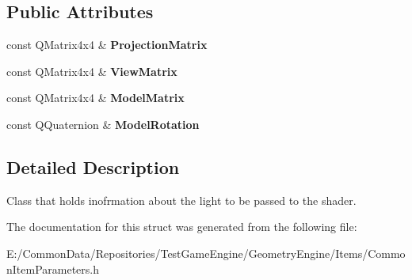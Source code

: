 \subsection*{Public Attributes}
\begin{DoxyCompactItemize}
\item 
\mbox{\label{struct_geometry_engine_1_1_lighting_transformation_data_a67f3cbd5104398dae3988fe228128422}} 
const Q\+Matrix4x4 \& {\bfseries Projection\+Matrix}
\item 
\mbox{\label{struct_geometry_engine_1_1_lighting_transformation_data_ae7610e04dd2bc7c8fc05c69d6809dda6}} 
const Q\+Matrix4x4 \& {\bfseries View\+Matrix}
\item 
\mbox{\label{struct_geometry_engine_1_1_lighting_transformation_data_a5420a915cce7b22552030b82b00d5142}} 
const Q\+Matrix4x4 \& {\bfseries Model\+Matrix}
\item 
\mbox{\label{struct_geometry_engine_1_1_lighting_transformation_data_a3d67f5f8a46ac726ef33aced8455d068}} 
const Q\+Quaternion \& {\bfseries Model\+Rotation}
\end{DoxyCompactItemize}


\subsection{Detailed Description}
Class that holds inofrmation about the light to be passed to the shader. 

The documentation for this struct was generated from the following file\+:\begin{DoxyCompactItemize}
\item 
E\+:/\+Common\+Data/\+Repositories/\+Test\+Game\+Engine/\+Geometry\+Engine/\+Items/Common\+Item\+Parameters.\+h\end{DoxyCompactItemize}
